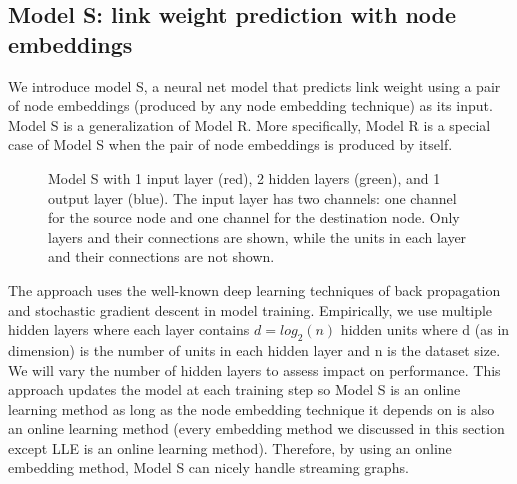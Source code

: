\documentclass[12pt]{WSUThesis}
\theoremstyle{definition}
\begin{document}
\subsection{Model S: link weight prediction with node embeddings}
We introduce model S, a neural net model that predicts link weight using a pair of node embeddings (produced by any node embedding technique) as its input.
Model S is a generalization of Model R. More specifically, Model R is a special case of Model S when the pair of node embeddings is produced by itself.
\begin{figure}[ht]\centering
	\newcommand{\layersep}{1cm}
	\caption{
		Model S with 1 input layer (red), 2 hidden layers (green), and 1 output layer (blue).
		The input layer has two channels: one channel for the source node and one channel for the destination node.
		Only layers and their connections are shown,
		while the units in each layer and their connections are not shown.
	}
	\label{fig:model-s}
\end{figure}

The approach uses the well-known deep learning techniques of back propagation \citep{rumelhart1988learning} and stochastic gradient descent \citep{lecun2012efficient} in model training.
Empirically, we use multiple hidden layers where each layer contains $ d = log_2(n) $ hidden units where d (as in dimension) is the number of units in each hidden layer and n is the dataset size.
We will vary the number of hidden layers to assess impact on performance.
This approach updates the model at each training step so Model S is an online learning method as long as the node embedding technique it depends on is also an online learning method (every embedding method we discussed in this section except LLE is an online learning method).
Therefore, by using an online embedding method, Model S can nicely handle streaming graphs.
\end{document}
